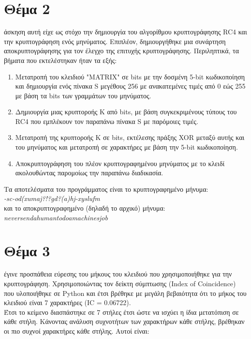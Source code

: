 \documentclass[a4paper, 11pt]{article}
\newcommand{\lt}{\latintext}
\newcommand\tab[1][1cm]{\hspace*{#1}}
\begin{document}
\newpage


\section*{Θέμα 2}

 άσκηση αυτή είχε ως στόχο την δημιουργία του αλγορίθμου κρυπτογράφησης {\lt RC4} και την κρυπτογράφηση ενός μηνύματος. Επιπλέον, δημιουργήθηκε μια συνάρτηση αποκρυπτογράφησης για τον έλεγχο της επιτυχής κρυπτογράφησης. Περιληπτικά, τα βήματα που εκτελέστηκαν ήταν τα εξής:
\begin{enumerate}

\item Μετατροπή του κλειδιού "{\lt MATRIX}" σε {\lt bits} με την δοσμένη 5-{\lt bit} κωδικοποίηση και δημιουργία ενός πίνακα {\lt S} μεγέθους 256 με ανακατεμένες τιμές από 0 εώς 255 με βάση τα {\lt bits} των γραμμάτων του μηνύματος.

\item Δημιουργία μιας κρυπτοροής Κ από {\lt bits}, με βάση συγκεκριμένους τύπους του {\lt RC4} που εμπλέκουν τον παραπάνω πίνακα {\lt S} με παρόμοιες τιμές.

\item Μετατροπή της κρυπτοροής Κ σε {\lt bits}, εκτέλεσης πράξης {\lt XOR} μεταξύ αυτής και του μηνύματος και μετατροπή σε χαρακτήρες με βάση την 5-{\lt bit} κωδικοποίηση.

\item Αποκρυπτογράφηση του πλέον κρυπτογραφημένου μηνύματος με το κλειδί ακολουθώντας παρομοίως την παραπάνω διαδικασία. \\

\end{enumerate}


Τα αποτελέσματα του προγράμματος είναι το κρυπτογραφημένο μήνυμα: \\
\textit{{\lt -sc-od(xumaj?!?gd?(a)hj-xyslufm}} \\
και το αποκρυπτογραφημένο (δηλαδή το αρχικό) μήνυμα: \\
\textit{{\lt neversendahumantodoamachinesjob}}



\newpage


\section*{Θέμα 3}
 έγινε προσπάθεια εύρεσης του μήκους του κλειδιού που χρησιμοποιήθηκε για την κρυπτογράφηση.
Χρησιμοποιώντας τον δείκτη σύμπτωσης ({\lt Index of Coincidence}) που υλοποιήθηκε σε {\lt Python} και έτσι βρέθηκε
με μεγάλη βεβαιότητα ότι το μήκος του κλειδιού είναι 7 χαρακτήρες ({\lt IC} = 0.06722).
\\
Έτσι το κείμενο διασπάστηκε σε 7 στήλες έτσι ώστε να ισχύει η ίδια μετατόπιση σε κάθε στήλη. Κάνοντας ανάλυση συχνοτήτων
των χαρακτήρων κάθε στήλης, βρέθηκαν οι πιο συχνοί χαρακτήρες κάθε στήλης. Αυτοί είναι:
\end{document}
